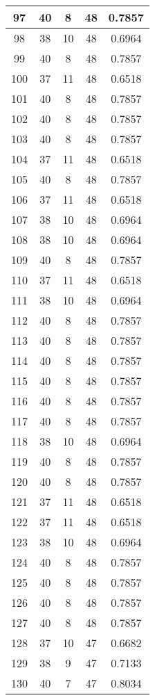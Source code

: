 \documentclass[letterpaper, 12pt]{article}
\begin{document}
\begin{longtable}{|c|c|c|c|c|}
\hline
97 & 40 & 8 & 48 & 0.7857 \\
\hline
98 & 38 & 10 & 48 & 0.6964 \\
\hline
99 & 40 & 8 & 48 & 0.7857 \\
\hline
100 & 37 & 11 & 48 & 0.6518 \\
\hline
101 & 40 & 8 & 48 & 0.7857 \\
\hline
102 & 40 & 8 & 48 & 0.7857 \\
\hline
103 & 40 & 8 & 48 & 0.7857 \\
\hline
104 & 37 & 11 & 48 & 0.6518 \\
\hline
105 & 40 & 8 & 48 & 0.7857 \\
\hline
106 & 37 & 11 & 48 & 0.6518 \\
\hline
107 & 38 & 10 & 48 & 0.6964 \\
\hline
108 & 38 & 10 & 48 & 0.6964 \\
\hline
109 & 40 & 8 & 48 & 0.7857 \\
\hline
110 & 37 & 11 & 48 & 0.6518 \\
\hline
111 & 38 & 10 & 48 & 0.6964 \\
\hline
112 & 40 & 8 & 48 & 0.7857 \\
\hline
113 & 40 & 8 & 48 & 0.7857 \\
\hline
114 & 40 & 8 & 48 & 0.7857 \\
\hline
115 & 40 & 8 & 48 & 0.7857 \\
\hline
116 & 40 & 8 & 48 & 0.7857 \\
\hline
117 & 40 & 8 & 48 & 0.7857 \\
\hline
118 & 38 & 10 & 48 & 0.6964 \\
\hline
119 & 40 & 8 & 48 & 0.7857 \\
\hline
120 & 40 & 8 & 48 & 0.7857 \\
\hline
121 & 37 & 11 & 48 & 0.6518 \\
\hline
122 & 37 & 11 & 48 & 0.6518 \\
\hline
123 & 38 & 10 & 48 & 0.6964 \\
\hline
124 & 40 & 8 & 48 & 0.7857 \\
\hline
125 & 40 & 8 & 48 & 0.7857 \\
\hline
126 & 40 & 8 & 48 & 0.7857 \\
\hline
127 & 40 & 8 & 48 & 0.7857 \\
\hline
128 & 37 & 10 & 47 & 0.6682 \\
\hline
129 & 38 & 9 & 47 & 0.7133 \\
\hline
130 & 40 & 7 & 47 & 0.8034 \\

\end{longtable}
\end{document}
